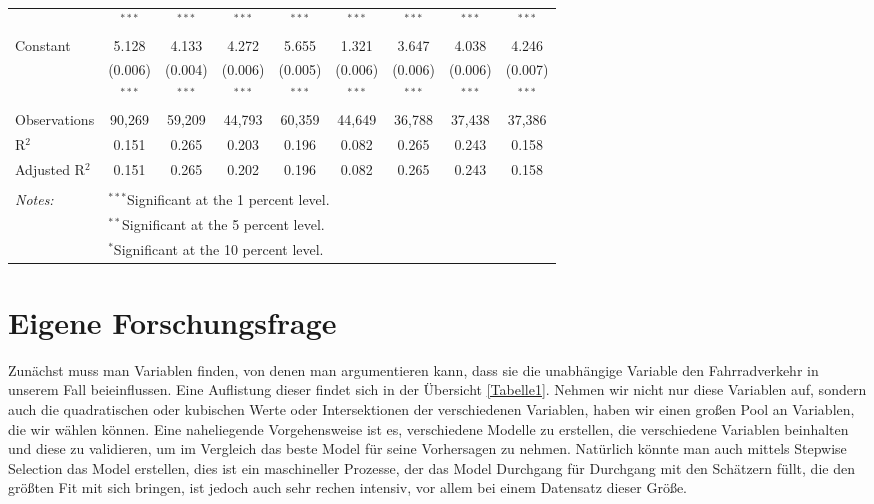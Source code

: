 \documentclass[a4paper,12pt]{thesis}
\begin{document}
\begin{table}[!htbp]
\begin{tabular}{@{\extracolsep{-8pt}}lcccccccc}
		& $^{***}$ & $^{***}$ & $^{***}$ & $^{***}$ & $^{***}$ & $^{***}$ & $^{***}$ & $^{***}$ \\ 
		Constant & 5.128 & 4.133 & 4.272 & 5.655 & 1.321 & 3.647 & 4.038 & 4.246 \\ 
		& (0.006) & (0.004) & (0.006) & (0.005) & (0.006) & (0.006) & (0.006) & (0.007) \\ 
		& $^{***}$ & $^{***}$ & $^{***}$ & $^{***}$ & $^{***}$ & $^{***}$ & $^{***}$ & $^{***}$ \\ 
		Observations & 90,269 & 59,209 & 44,793 & 60,359 & 44,649 & 36,788 & 37,438 & 37,386 \\ 
		R$^{2}$ & 0.151 & 0.265 & 0.203 & 0.196 & 0.082 & 0.265 & 0.243 & 0.158 \\ 
		Adjusted R$^{2}$ & 0.151 & 0.265 & 0.202 & 0.196 & 0.082 & 0.265 & 0.243 & 0.158 \\  
		\hline \\[-1.8ex] 
		\textit{Notes:} & \multicolumn{8}{l}{$^{***}$Significant at the 1 percent level.} \\ 
		& \multicolumn{8}{l}{$^{**}$Significant at the 5 percent level.} \\ 
		& \multicolumn{8}{l}{$^{*}$Significant at the 10 percent level.} \\ 
	\end{tabular} 
\end{table} 



\chapter{Eigene Forschungsfrage}


Zunächst muss man Variablen finden, von denen man argumentieren kann, dass sie die unabhängige Variable den Fahrradverkehr in unserem Fall beieinflussen. Eine Auflistung dieser findet sich in der Übersicht \ref{Tabelle1}. Nehmen wir nicht nur diese Variablen auf, sondern auch die quadratischen oder kubischen Werte oder Intersektionen der verschiedenen Variablen, haben wir einen großen Pool an Variablen, die wir wählen können. Eine naheliegende Vorgehensweise ist es, verschiedene Modelle zu erstellen, die verschiedene Variablen beinhalten und diese zu validieren, um im Vergleich das beste Model für seine Vorhersagen zu nehmen. Natürlich könnte man auch mittels Stepwise Selection das Model erstellen, dies ist ein maschineller Prozesse, der das Model Durchgang für Durchgang mit den Schätzern füllt, die den größten Fit mit sich bringen, ist jedoch auch sehr rechen intensiv, vor allem bei einem Datensatz dieser Größe.\\
\end{document}

